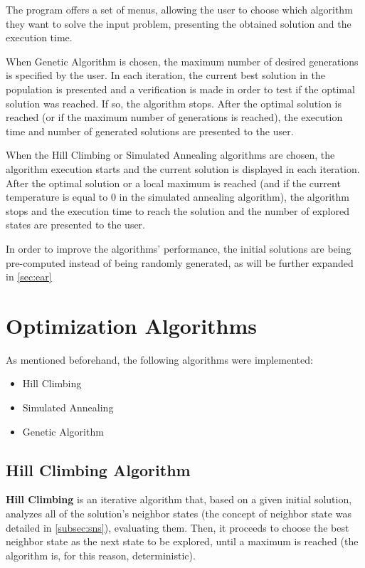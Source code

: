 \documentclass[conference]{IEEEtran}
\begin{document}
The program offers a set of menus, allowing the user to choose which algorithm they want to solve the input problem, presenting the obtained solution and the execution time. 

When Genetic Algorithm is chosen, the maximum number of desired generations is specified by the user. In each iteration, the current best solution in the population is presented and a verification is made in order to test if the optimal solution was reached. If so, the algorithm stops. After the optimal solution is reached (or if the maximum number of generations is reached), the execution time and number of generated solutions are presented to the user.

When the Hill Climbing or Simulated Annealing algorithms are chosen, the algorithm execution starts and the current solution is displayed in each iteration. After the optimal solution or a local maximum is reached (and if the current temperature is equal to 0 in the simulated annealing algorithm), the algorithm stops and the execution time to reach the solution and the number of explored states are presented to the user.

In order to improve the algorithms' performance, the initial solutions are being pre-computed instead of being randomly generated, as will be further expanded in \autoref{sec:ear}

\section{Optimization Algorithms}

As mentioned beforehand, the following algorithms were implemented:

\begin{itemize}
    \item Hill Climbing
    \item Simulated Annealing
    \item Genetic Algorithm
\end{itemize}

\subsection{Hill Climbing Algorithm} \label{subsec:hca}

\textbf{Hill Climbing} is an iterative algorithm that, based on a given initial solution, analyzes all of the solution's neighbor states (the concept of neighbor state was detailed in \autoref{subsec:sns}), evaluating them. Then, it proceeds to choose the best neighbor state as the next state to be explored, until a maximum is reached (the algorithm is, for this reason, deterministic).
\end{document}
